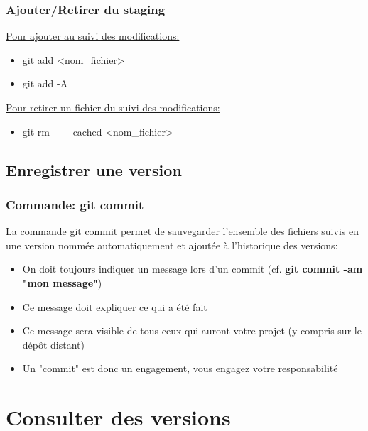 \documentclass{beamer}
\begin{document}
\begin{frame}
\frametitle{Ajouter/Retirer du staging}

\underline{Pour ajouter au suivi des modifications:}
\smallskip
\begin{itemize}
    \item[] git add <nom\_fichier>
    \item[] git add -A
\end{itemize}
\bigskip

\underline{Pour retirer un fichier du suivi des modifications:}
\smallskip
\begin{itemize}
    \item[] git rm $--$cached <nom\_fichier>
\end{itemize}

\end{frame}

\subsection{Enregistrer une version}

\begin{frame}
\frametitle{Commande: git commit}
La commande git commit permet de sauvegarder l'ensemble des fichiers suivis en une version nommée automatiquement et ajoutée à l'historique des versions:
\smallskip
\begin{itemize}
    \item On doit toujours indiquer un message lors d'un commit (cf. \textbf{git commit -am "mon message"})
    \item Ce message doit expliquer ce qui a été fait
    \item Ce message sera visible de tous ceux qui auront votre projet (y compris sur le dépôt distant)
    \item Un "commit" est donc un engagement, vous engagez votre responsabilité
\end{itemize}
\end{frame}




\section{Consulter des versions}
\end{document}
